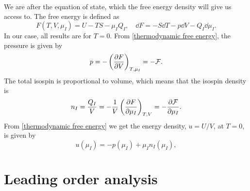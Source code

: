 We are after the equation of state, which the free energy density will give us access to.
The free energy is defined as
%
\begin{equation}
    \label{thermodynamic free energy}
    F(T, V, \mu_I) = U - TS - \mu_I Q_I, 
    \quad \dd 
    F = - S \dd T - p \dd V - Q_I \dd \mu_I.
\end{equation}
%
In our case, all results are for $T = 0$.
From \autoref{thermodynamic free energy}, the pressure is given by
%
\begin{equation}
    \label{pressure form free energy}
    p = - \left(\pdv{F}{V}\right)_{T, \mu_I} = - \mathcal{F}.
\end{equation}
%
The total isospin is proportional to volume, which means that the isospin density is
%
\begin{equation}
    n_I = \frac{Q_I}{V} = - \frac{1}{V} \left(\pdv{F}{\mu_I}\right)_{T, V}
    = - \pdv{\mathcal{F}}{\mu_I}.
\end{equation}
%
From \autoref{thermodynamic free energy} we get the energy density, $u = U/V$, at $T = 0$, is given by
%
\begin{equation}
    \label{energy density form pressure and isospin}
    u(\mu_I) = -p(\mu_I) + \mu_I n_I(\mu_I),
\end{equation}


\section{Leading order analysis}

